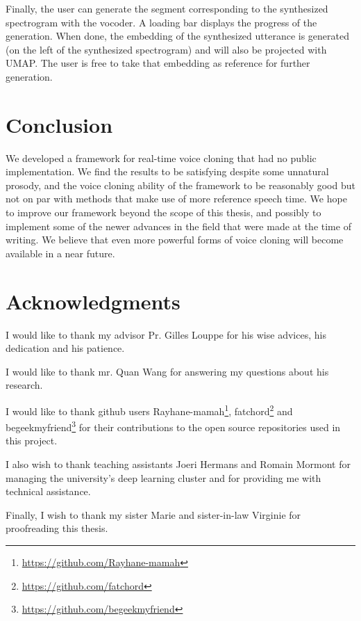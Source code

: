 \documentclass[a4paper, oneside, 12pt, english]{article}
\begin{document}
Finally, the user can generate the segment corresponding to the synthesized spectrogram with the vocoder. A loading bar displays the progress of the generation. When done, the embedding of the synthesized utterance is generated (on the left of the synthesized spectrogram) and will also be projected with UMAP. The user is free to take that embedding as reference for further generation.


\section{Conclusion}
We developed a framework for real-time voice cloning that had no public implementation. We find the results to be satisfying despite some unnatural prosody, and the voice cloning ability of the framework to be reasonably good but not on par with methods that make use of more reference speech time. We hope to improve our framework beyond the scope of this thesis, and possibly to implement some of the newer advances in the field that were made at the time of writing. We believe that even more powerful forms of voice cloning will become available in a near future.
\clearpage

\section*{Acknowledgments}
I would like to thank my advisor Pr. Gilles Louppe for his wise advices, his dedication and his patience.

\noindent I would like to thank mr. Quan Wang for answering my questions about his research.

\noindent I would like to thank github users Rayhane-mamah\footnote{\url{https://github.com/Rayhane-mamah}}, fatchord\footnote{\url{https://github.com/fatchord}} and begeekmyfriend\footnote{\url{https://github.com/begeekmyfriend}} for their contributions to the open source repositories used in this project.

\noindent I also wish to thank teaching assistants Joeri Hermans and Romain Mormont for managing the university's deep learning cluster and for providing me with technical assistance.

\noindent Finally, I wish to thank my sister Marie and sister-in-law Virginie for proofreading this thesis.
\end{document}
